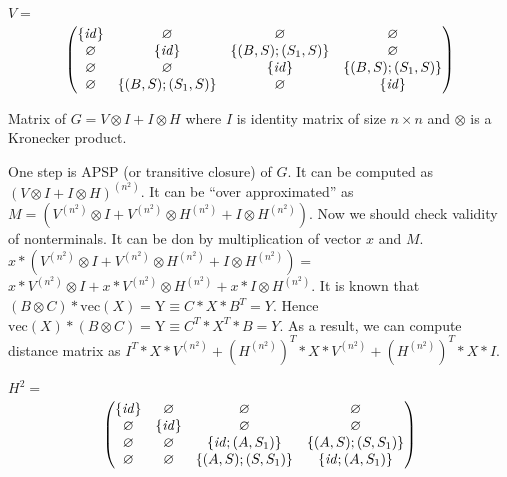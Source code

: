 $V=$
\begin{align*}
\begin{pmatrix}
      \{ \text{\emph{id}} \}       & \varnothing       & \varnothing       & \varnothing  \\ 
      \varnothing       & \{ \text{\emph{id}} \}       & \{(B,S);(S_1,S)\} & \varnothing  \\
      \varnothing       & \varnothing       & \{ \text{\emph{id}} \}       & \{(B,S);(S_1,S)\}  \\
      \varnothing       & \{(B,S);(S_1,S)\} & \varnothing       & \{ \text{\emph{id}} \}  \\
\end{pmatrix}
\end{align*}


Matrix of $G = V \otimes I + I \otimes H$ where $I$ is identity matrix of size $n \times n$ and $\otimes$ is a Kronecker product.


One step is APSP (or transitive closure) of $G$.
It can be computed as $(V \otimes I + I \otimes H)^{(n^2)}$.
It can be ``over approximated'' as $M=(V^{(n^2)} \otimes I + V^{(n^2)} \otimes H^{(n^2)} + I \otimes H^{(n^2)})$.
Now we should check validity of nonterminals.
It can be don by multiplication of vector $x$ and $M$.
$x*(V^{(n^2)} \otimes I + V^{(n^2)} \otimes H^{(n^2)} + I \otimes H^{(n^2)}) = $
$x*V^{(n^2)} \otimes I + x*V^{(n^2)} \otimes H^{(n^2)} + x * I \otimes H^{(n^2)} $.
It is known that $(B \otimes C)*\text{vec}(X) = \text{Y} \equiv C*X*B^T = Y$.
Hence $\text{vec}(X) * (B \otimes C) = \text{Y} \equiv C^T*X^T*B = Y$.
As a result, we can compute distance matrix as $I^T * X * V^{(n^2)} + (H^{(n^2)})^T * X * V^{(n^2)} + (H^{(n^2)})^T * X * I $.


$H^2=$
\begin{align*}
\begin{pmatrix}
      \{ \text{\emph{id}} \} & \varnothing            & \varnothing            & \varnothing            \\
      \varnothing            & \{ \text{\emph{id}} \} & \varnothing            & \varnothing            \\
      \varnothing            & \varnothing            & \{ \text{\emph{id}}; (A,S_1) \} & \{(A,S);(S,S_1)\}      \\
      \varnothing            & \varnothing            & \{(A,S);(S,S_1)\}      & \{ \text{\emph{id}}; (A,S_1) \}  \\
\end{pmatrix}
\end{align*}

